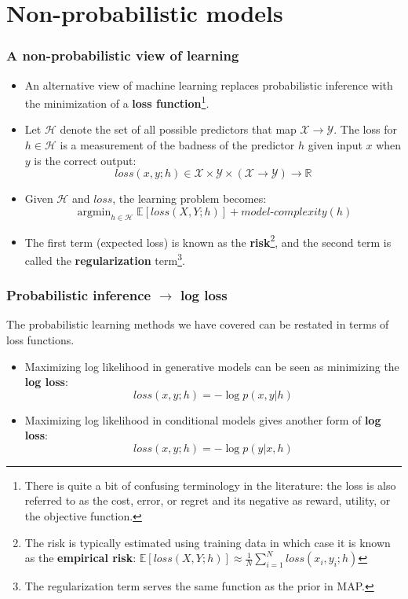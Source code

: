 \documentclass[ignorenonframetext,plain]{beamer}
\DeclareMathOperator*{\argmin}{argmin}
\newcommand{\loss}{\mathit{loss}}
\begin{document}
\section{Non-probabilistic models}
\frame{\sectionpage}

\begin{frame}\frametitle{A non-probabilistic view of learning} %
\begin{itemize}
\item An alternative view of machine learning replaces probabilistic
  inference with the minimization of a {\bf loss
    function}\footnote{There is quite a bit of confusing terminology
    in the literature: the loss is also referred to as the cost,
    error, or regret and its negative as reward, utility, or the
    objective function.}.
\item Let $\mathcal{H}$ denote the set of all possible predictors that
  map $\mathcal{X}\rightarrow\mathcal{Y}$.  The loss for
  $h\in\mathcal{H}$ is a measurement of the badness of the predictor
  $h$ given input $x$ when $y$ is the correct output:
  \[ \loss(x, y; h) \in \mathcal{X} \times \mathcal{Y}
  \times (\mathcal{X}\rightarrow\mathcal{Y}) \rightarrow \mathbb{R}
\]
\item Given $\mathcal{H}$ and $\loss$, the learning problem becomes:\[
  \argmin_{h\in\mathcal{H}} \mathbb{E}[\loss(X, Y; h)] +
  \textit{model-complexity}(h)
\]
\item The first term (expected loss) is known as the {\bf
  risk}\footnote{The risk is typically estimated using training data
  in which case it is known as the {\bf empirical risk}:
  $\mathbb{E}[\loss(X, Y; h)] \approx \frac{1}{N} \sum_{i=1}^N
  \loss(x_i, y_i; h)$ }, and the second term is called the {\bf
  regularization} term\footnote{The regularization term serves the
  same function as the prior in MAP.}.
\end{itemize}
\end{frame}

\begin{frame}\frametitle{Probabilistic inference $\rightarrow$ log loss}
The probabilistic learning methods we have covered can be restated in
terms of loss functions.
\begin{itemize}
\item Maximizing log likelihood in generative models can be seen as
  minimizing the {\bf log loss}:\[
\loss(x, y; h) = -\log p(x, y | h)
\]
\item Maximizing log likelihood in conditional models gives another
  form of {\bf log loss}:\[
\loss(x, y; h) = -\log p(y | x, h)
\]
\end{itemize}
\end{frame}
\end{document}
